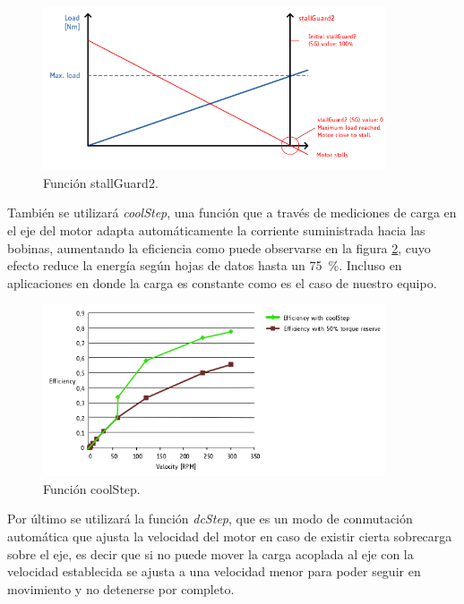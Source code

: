 \begin{figure}[htpb]
\centering 
\includegraphics[width=0.9\textwidth]{./Figures/tmc5130_stallguard2.png}
\caption{Función stallGuard2.}
\label{fig:tmc5130_stallGuard2}
\end{figure}

También se utilizará \textit{coolStep}, una función que a través de mediciones de carga en el eje del motor adapta automáticamente la corriente suministrada hacia las bobinas, aumentando la eficiencia como puede observarse en la figura \ref{fig:tmc5130_coolStep}, cuyo efecto reduce la energía según hojas de datos \citep{3_web_trinamic_producto} hasta un \SI{75}{\percent}. Incluso en aplicaciones en donde la carga es constante como es el caso de nuestro equipo.

\begin{figure}[htpb]
\centering 
\includegraphics[width=0.9\textwidth]{./Figures/tmc5130_coolstep.png}
\caption{Función coolStep.}
\label{fig:tmc5130_coolStep}
\end{figure}

Por último se utilizará la función \textit{dcStep}, que es un modo de conmutación automática que ajusta la velocidad del motor en caso de existir cierta sobrecarga sobre el eje, es decir que si no puede mover la carga acoplada al eje con la velocidad establecida se ajusta a una velocidad menor para poder seguir en movimiento y no detenerse por completo. 


